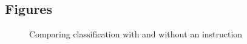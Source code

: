\documentclass{bmcart}
\begin{document}
\begin{backmatter}





\section*{Figures}


\begin{figure}
\caption{\label{fig:comparison}Comparing classification with and without an instruction}
\end{figure}




\end{backmatter}
\end{document}
